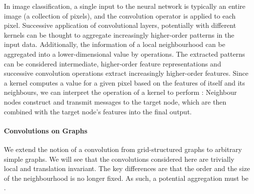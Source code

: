 \documentclass[
	fontsize=10pt, %
	twoside=false, %
	secnumdepth=1, %
  toc=indentunnumbered %
]{kaobook}
\begin{document}
In image classification, a single input to the neural network is typically an
entire image (a collection of pixels), and the convolution operator is applied
to each pixel. 
%
Successive application of convolutional layers,
potentially with different kernels can be thought to aggregate increasingly
higher-order patterns in the input data. Additionally, the information of a
local neighbourhood can be aggregated into a lower-dimensional value by
 operations.
%
The extracted patterns can be
considered intermediate, higher-order feature representations and successive
convolution operations extract increasingly higher-order features.
%
Since a kernel computes a value for a given pixel based on the features of
itself and its neighbours, we can interpret the operation of a kernel to perform
: Neighbour nodes construct and transmit messages to the
target node, which are then combined with the target node's features into the
final output.


\paragraph{Convolutions on Graphs} We extend the notion of a convolution
from grid-structured graphs to arbitrary simple graphs. We will see that
the convolutions considered here are trivially local and translation invariant.
The key differences are that the order and the size of the neighbourhood is no
longer fixed. As such, a potential aggregation must be .
\end{document}
